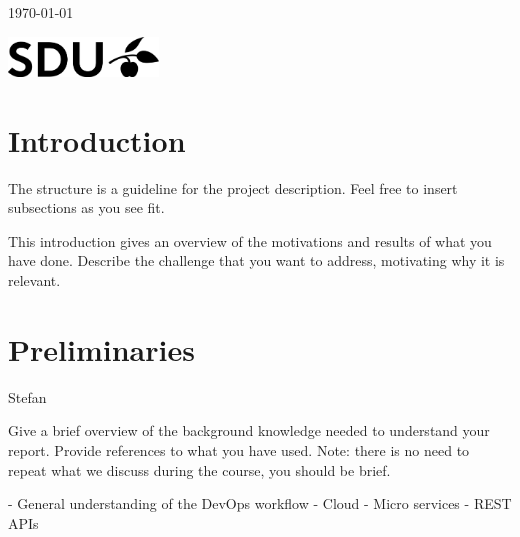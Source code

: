 \documentclass[a4paper,12pt]{article}
\begin{document}
\begin{titlepage}

	\vfill\vfill\vfill %

	{\large \today}


	\vfill\vfill
	\begin{centering}
	\includegraphics[width=0.3\textwidth]{SDU_logo}\\[1cm]
	\end{centering}
	

	\vfill %

\end{titlepage}


\section{Introduction}

The structure is a guideline for the project description. Feel free to insert 
subsections as you
see fit.

This introduction gives an overview of the motivations and results of what you 
have
done. Describe the challenge that you want to address, motivating why it is
relevant.


\section{Preliminaries}

Stefan

Give a brief overview of the background knowledge needed to understand your
report. Provide references to what you have used. Note: there is no need to
repeat what we discuss during the course, you should be brief.

- General understanding of the DevOps workflow
- Cloud
- Micro services
- REST APIs
\end{document}
